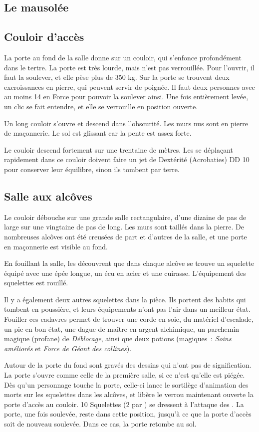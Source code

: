 \documentclass[a4paper,10pt,openany]{book}
\begin{document}
\begin{multicols}{2}
\section{Le mausolée}
\subsection{Couloir d’accès}
La porte au fond de la salle donne sur un couloir, qui s’enfonce profondément dans le tertre. La porte est très lourde, mais n’est pas verrouillée.
Pour l’ouvrir, il faut la soulever, et elle pèse plus de 350 kg. Sur la porte se trouvent deux excroissances en pierre, qui peuvent servir de poignée.
Il faut deux personnes avec au moins 14 en Force pour pouvoir la soulever ainsi. Une fois entièrement levée, un clic se fait entendre, et elle se
verrouille en position ouverte.
\begin{paperbox}{ }
	Un long couloir s’ouvre et descend dans l’obscurité. Les murs nus sont en pierre de maçonnerie. Le sol est glissant car la pente est assez forte.
\end{paperbox}
Le couloir descend fortement sur une trentaine de mètres. Les \PJs se déplaçant rapidement dans ce couloir doivent faire un jet de Dextérité
(Acrobaties) DD 10 pour conserver leur équilibre, sinon ils tombent par terre.
\subsection{Salle aux alcôves}
\begin{paperbox}{ }
	Le couloir débouche sur une grande salle rectangulaire, d’une dizaine de pas de large sur une vingtaine de pas de long. Les murs sont taillés
	dans la pierre. De nombreuses alcôves ont été creusées de part et d’autres de la salle, et une porte en maçonnerie est visible au fond.
\end{paperbox}
En fouillant la salle, les \PJs découvrent que dans chaque alcôve se trouve un squelette équipé avec une épée longue, un écu en acier et une cuirasse.
L’équipement des squelettes est rouillé.\par Il y a également deux autres squelettes dans la pièce. Ils portent des habits qui tombent en poussière,
et leurs équipements n’ont pas l’air dans un meilleur état. Fouiller ces cadavres permet de trouver une corde en soie, du matériel d’escalade, un pic
en bon état, une dague de maître en argent alchimique, un parchemin magique (profane) de \emph{Déblocage}, ainsi que deux potions (magiques :
\emph{Soins améliorés} et \emph{Force de Géant des collines}).\par Autour de la porte du fond sont gravés des dessins qui n’ont pas de signification.
La porte s’ouvre comme celle de la première salle, si ce n’est qu’elle est piégée. Dès qu’un personnage touche la porte, celle-ci lance le sortilège
d’animation des morts sur les  squelettes dans les alcôves, et libère le verrou maintenant ouverte la porte d’accès au couloir. 10 Squelettes (2 par
\PJ) se dressent à l’attaque des  \PJs. La porte, une fois soulevée, reste dans cette position, jusqu’à ce que la porte d’accès soit de nouveau
soulevée. Dans ce cas, la porte retombe au sol.


\end{multicols}
\end{document}

